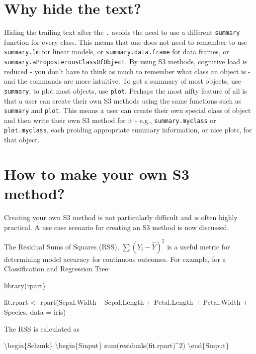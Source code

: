 \section{Why hide the text?}\label{why-hide-the-text}

Hiding the trailing text after the \texttt{.} avoids the need to use a
different \texttt{summary} function for every class. This means that one
does not need to remember to use \texttt{summary.lm} for linear models,
or \texttt{summary.data.frame} for data frames, or
\texttt{summary.aProposterousClassOfObject}. By using S3 methods,
cognitive load is reduced - you don't have to think as much to remember
what class an object is - and the commands are more intuitive. To get a
summary of most objects, use \texttt{summary}, to plot most objects, use
\texttt{plot}. Perhaps the most nifty feature of all is that a user can
create their own S3 methods using the same functions such as
\texttt{summary} and \texttt{plot}. This means a user can create their
own special class of object and then write their own S3 method for it -
e.g., \texttt{summary.myclass} or \texttt{plot.myclass}, each proiding
appropriate summary information, or nice plots, for that object.

\section{How to make your own S3
method?}\label{how-to-make-your-own-s3-method}

Creating your own S3 method is not particularly difficult and is often
highly practical. A use case scenario for creating an S3 method is now
discussed.

The Residual Sums of Squares (RSS), \(\sum(Y_i - \hat{Y})^2\) is a
useful metric for determining model accuracy for continuous outcomes.
For example, for a Classification and Regression Tree:

\begin{Schunk}
\begin{Sinput}
library(rpart)

fit.rpart <- rpart(Sepal.Width ~ Sepal.Length + Petal.Length + Petal.Width + Species, data = iris)
\end{Sinput}
\end{Schunk}

The RSS is calculated as

\textbackslash{}begin\{Schunk\} \textbackslash{}begin\{Sinput\}
sum(residuals(fit.rpart)\^{}2) \textbackslash{}end\{Sinput\}

